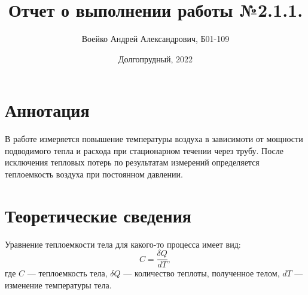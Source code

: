 \documentclass[a4paper,11pt]{article}
\title{Отчет о выполнении работы №2.1.1.}
\author{Воейко Андрей Александрович, Б01-109}
\date{Долгопрудный, 2022}
\begin{document}
\maketitle
\newpage
\section{Аннотация}
В работе измеряется повышение температуры воздуха в зависимоти от мощности подводимого тепла и расхода при стационарном течении через трубу. После исключения тепловых потерь по результатам измерений определяется теплоемкость воздуха при постоянном давлении.
\section{Теоретические сведения}
Уравнение теплоемкости тела для какого-то процесса имеет вид:
\begin{equation}    \label{eq1}
C = \frac{\delta Q}{dT},
\end{equation}
где $C$ — теплоемкость тела, $\delta Q$ — количество теплоты, полученное телом, $dT$ — изменение температуры тела.
\end{document}
